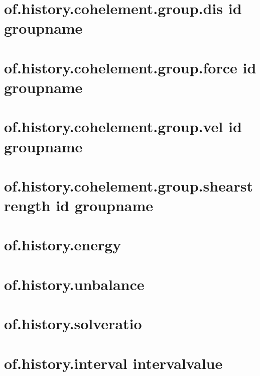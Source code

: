 \documentclass[letterpaper,10pt,english]{sphinxmanual}
\begin{document}
\section{of.history.cohelement.group.dis id groupname}
\label{\detokenize{rst_tutorials/command_line_guide:of-history-cohelement-group-dis-id-groupname}}\label{\detokenize{rst_tutorials/command_line_guide:section-20}}

\section{of.history.cohelement.group.force id groupname}
\label{\detokenize{rst_tutorials/command_line_guide:of-history-cohelement-group-force-id-groupname}}

\section{of.history.cohelement.group.vel id groupname}
\label{\detokenize{rst_tutorials/command_line_guide:of-history-cohelement-group-vel-id-groupname}}

\section{of.history.cohelement.group.shearstrength id groupname}
\label{\detokenize{rst_tutorials/command_line_guide:of-history-cohelement-group-shearstrength-id-groupname}}

\section{of.history.energy}
\label{\detokenize{rst_tutorials/command_line_guide:of-history-energy}}\label{\detokenize{rst_tutorials/command_line_guide:section-22}}\label{\detokenize{rst_tutorials/command_line_guide:section-21}}

\section{of.history.unbalance}
\label{\detokenize{rst_tutorials/command_line_guide:of-history-unbalance}}

\section{of.history.solveratio}
\label{\detokenize{rst_tutorials/command_line_guide:of-history-solveratio}}

\section{of.history.interval intervalvalue}
\label{\detokenize{rst_tutorials/command_line_guide:of-history-interval-intervalvalue}}\label{\detokenize{rst_tutorials/command_line_guide:section-23}}
\end{document}
